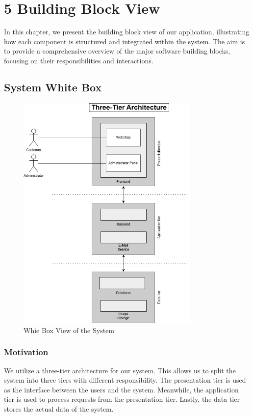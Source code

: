 \hypertarget{section-building-block-view}{%
\section{5 Building Block View}\label{section-building-block-view}}
In this chapter, we present the building block view of our application, illustrating how each component is structured and integrated within the system. The aim is to provide a comprehensive overview of the major software building blocks, focusing on their responsibilities and interactions.
\subsection{System White Box}
\begin{figure}[H]
    \centering
    \includegraphics[width=0.8\textwidth]{images/building_block_system_whitebox.png}
    \caption{Whie Box View of the System}
\end{figure}

\subsubsection{Motivation}
We utilize a three-tier architecture for our system.
This allows us to split the system into three tiers with different responsibility.
The presentation tier is used as the interface between the users and the system.
Meanwhile, the application tier is used to process requests from the presentation tier.
Lastly, the data tier stores the actual data of the system.


